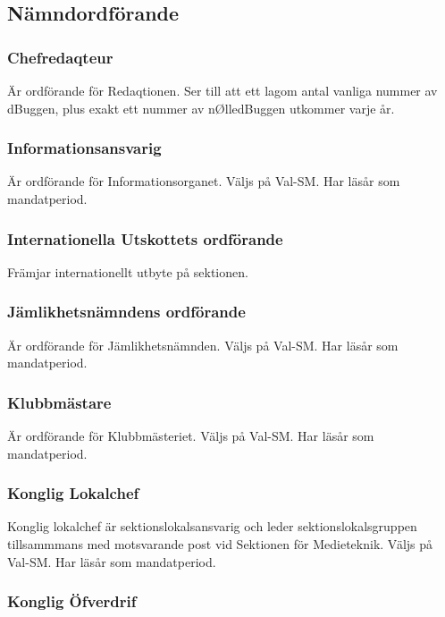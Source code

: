 \documentclass[a4paper,12pt]{article}
\begin{document}
\subsection{Nämndordförande}

\subsubsection{Chefredaqteur}

Är ordförande för Redaqtionen. Ser till att ett lagom antal vanliga nummer av dBuggen, plus exakt ett nummer av nØlledBuggen utkommer varje år.

\subsubsection{Informationsansvarig}

Är ordförande för Informationsorganet. Väljs på Val-SM. Har läsår som mandatperiod.

\subsubsection{Internationella Utskottets ordförande}

Främjar internationellt utbyte på sektionen.

\subsubsection{Jämlikhetsnämndens ordförande}

Är ordförande för Jämlikhetsnämnden. Väljs på Val-SM. Har läsår som mandatperiod.

\subsubsection{Klubbmästare}

Är ordförande för Klubbmästeriet. Väljs på Val-SM. Har läsår som mandatperiod.

\subsubsection{Konglig Lokalchef}

Konglig lokalchef är sektionslokalsansvarig och leder sektionslokalsgruppen tillsammmans med motsvarande post vid Sektionen för Medieteknik. Väljs på Val-SM. Har läsår som mandatperiod.

\subsubsection{Konglig Öfverdrif}
\end{document}
